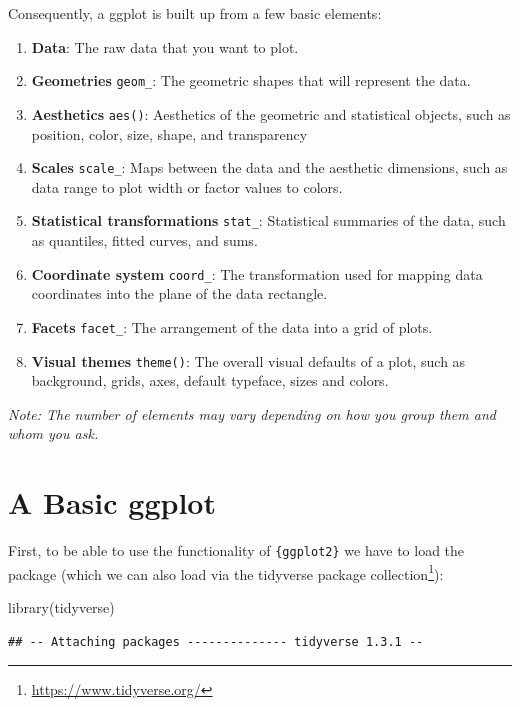 \documentclass[
]{krantz}
\makeatletter
\newenvironment{Shaded}{\begin{snugshade}}{\end{snugshade}}
\newcommand{\FunctionTok}[1]{\textcolor[rgb]{0,0,0}{#1}}
\newcommand{\NormalTok}[1]{#1}
\providecommand{\tightlist}{%
  \setlength{\itemsep}{0pt}\setlength{\parskip}{0pt}}
\renewcommand{\href}[2]{#2\footnote{\url{#1}}}
\newenvironment{kframe}{%
\medskip{}
\setlength{\fboxsep}{.8em}
 \def\at@end@of@kframe{}%
 \ifinner\ifhmode%
  \def\at@end@of@kframe{\end{minipage}}%
  \begin{minipage}{\columnwidth}%
 \fi\fi%
 \def\FrameCommand##1{\hskip\@totalleftmargin \hskip-\fboxsep
 \colorbox{shadecolor}{##1}\hskip-\fboxsep
     \hskip-\linewidth \hskip-\@totalleftmargin \hskip\columnwidth}%
 \MakeFramed {\advance\hsize-\width
   \@totalleftmargin\z@ \linewidth\hsize
   \@setminipage}}%
 {\par\unskip\endMakeFramed%
 \at@end@of@kframe}
\renewenvironment{Shaded}{\begin{kframe}}{\end{kframe}}
\makeatother
\begin{document}
Consequently, a ggplot is built up from a few basic elements:

\begin{enumerate}
\def\labelenumi{\arabic{enumi}.}
\tightlist
\item
  \textbf{Data}:
  The raw data that you want to plot.
\item
  \textbf{Geometries} \texttt{geom\_}:
  The geometric shapes that will represent the data.
\item
  \textbf{Aesthetics} \texttt{aes()}:
  Aesthetics of the geometric and statistical objects, such as position, color, size, shape, and transparency
\item
  \textbf{Scales} \texttt{scale\_}:
  Maps between the data and the aesthetic dimensions, such as data range to plot width or factor values to colors.
\item
  \textbf{Statistical transformations} \texttt{stat\_}:
  Statistical summaries of the data, such as quantiles, fitted curves, and sums.
\item
  \textbf{Coordinate system} \texttt{coord\_}:
  The transformation used for mapping data coordinates into the plane of the data rectangle.
\item
  \textbf{Facets} \texttt{facet\_}:
  The arrangement of the data into a grid of plots.
\item
  \textbf{Visual themes} \texttt{theme()}:
  The overall visual defaults of a plot, such as background, grids, axes, default typeface, sizes and colors.
\end{enumerate}

\emph{Note: The number of elements may vary depending on how you group them and whom you ask.}

\hypertarget{default}{%
\section{A Basic ggplot}\label{default}}

First, to be able to use the functionality of \texttt{\{ggplot2\}} we have to load the package (which we can also load via the \href{https://www.tidyverse.org/}{tidyverse package collection}):

\begin{Shaded}
\begin{Highlighting}[]
\FunctionTok{library}\NormalTok{(tidyverse)}
\end{Highlighting}
\end{Shaded}

\begin{verbatim}
## -- Attaching packages -------------- tidyverse 1.3.1 --
\end{verbatim}
\end{document}

